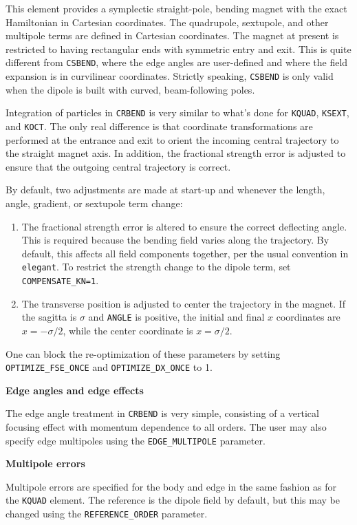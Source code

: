 This element provides a symplectic straight-pole, bending magnet with the exact
Hamiltonian in Cartesian coordinates.  
The quadrupole, sextupole, and other multipole terms are defined in Cartesian coordinates.
The magnet at present is restricted to having rectangular ends with symmetric entry and
exit.
This is quite different from \verb|CSBEND|, where the edge angles are user-defined and
where the field expansion is in curvilinear coordinates.
Strictly speaking, \verb|CSBEND| is only valid when the dipole is built with curved,
beam-following poles.

Integration of particles in \verb|CRBEND| is very similar to what's done for
\verb|KQUAD|, \verb|KSEXT|, and \verb|KOCT|. 
The only real difference is that coordinate transformations are performed at the
entrance and exit to orient the incoming central trajectory to the straight magnet axis.
In addition, the fractional strength error is adjusted to ensure that the 
outgoing central trajectory is correct.

By default, two adjustments are made at start-up and whenever the length, angle, 
gradient, or sextupole term change:
\begin{enumerate}
\item The fractional strength error is altered to ensure the correct deflecting angle. 
      This is required because the bending field varies along the trajectory.
      By default, this affects all field 
      components together, per the usual convention in {\tt elegant}. To restrict
      the strength change to the dipole term, set \verb|COMPENSATE_KN=1|.
\item The transverse position is adjusted to center the trajectory in the magnet.
      If the sagitta is $\sigma$ and \verb|ANGLE| is positive, the initial and final $x$ 
      coordinates are $x=-\sigma/2$, while the center coordinate is $x=\sigma/2$.
\end{enumerate}
One can block the re-optimization of these parameters by setting 
\verb|OPTIMIZE_FSE_ONCE| and \verb|OPTIMIZE_DX_ONCE| to 1.

{\bf Edge angles and edge effects} 

The edge angle treatment in \verb|CRBEND| is very simple, consisting of a 
vertical focusing effect with momentum dependence to all orders.
The user may also specify edge multipoles using the \verb|EDGE_MULTIPOLE| parameter.

{\bf Multipole errors}

Multipole errors are specified for the body and edge in the same fashion as for the
\verb|KQUAD| element.
The reference is the dipole field by default, but this may be changed using the
\verb|REFERENCE_ORDER| parameter.

